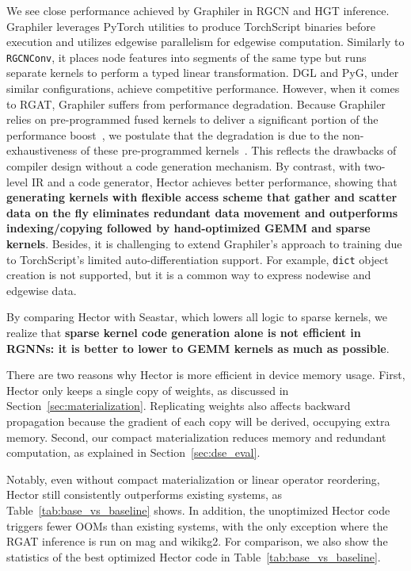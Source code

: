 We see close performance achieved by Graphiler in RGCN and HGT inference. Graphiler leverages PyTorch utilities to produce TorchScript binaries before execution and utilizes edgewise parallelism for edgewise computation. Similarly to \texttt{RGCNConv}, it places node features into segments of the same type but runs separate kernels to perform a typed linear transformation. DGL and PyG, under similar configurations, achieve competitive performance. However, when it comes to RGAT, Graphiler suffers from performance degradation. Because Graphiler relies on pre-programmed fused kernels to deliver a significant portion of the performance boost~\cite{xieGraphilerCompilerGraph}, we postulate that the degradation is due to the non-exhaustiveness of these pre-programmed kernels~\cite{xieGraphilerRepositoryGithub2023}.
This reflects the drawbacks of compiler design without a code generation mechanism. By contrast, with two-level IR and a code generator, Hector achieves better performance, showing that \textbf{generating kernels with flexible access scheme that gather and scatter data on the fly eliminates redundant data movement and outperforms indexing/copying followed by hand-optimized GEMM and sparse kernels}. Besides, it is challenging to extend Graphiler's approach to training due to TorchScript's limited auto-differentiation support. For example, \texttt{dict} object creation is not supported, but it is a common way to express nodewise and edgewise data. 

By comparing Hector with Seastar, which lowers all logic to sparse kernels, we realize that \textbf{sparse kernel code generation alone is not efficient in RGNNs: it is better to lower to GEMM kernels as much as possible}.





There are two reasons why Hector is more efficient in device memory usage. First, Hector only keeps a single copy of weights, as discussed in Section~\ref{sec:materialization}. Replicating weights also affects backward propagation because the gradient of each copy will be derived, occupying extra memory. Second, our compact materialization reduces memory and redundant computation, as explained in Section~\ref{sec:dse_eval}.








Notably, even without compact materialization or linear operator reordering, Hector still consistently outperforms existing systems, as Table~\ref{tab:base_vs_baseline} shows. In addition, the unoptimized Hector code triggers fewer OOMs than existing systems, with the only exception where the RGAT inference is run on mag and wikikg2. 
For comparison, we also show the statistics of the best optimized Hector code in Table~\ref{tab:base_vs_baseline}.


